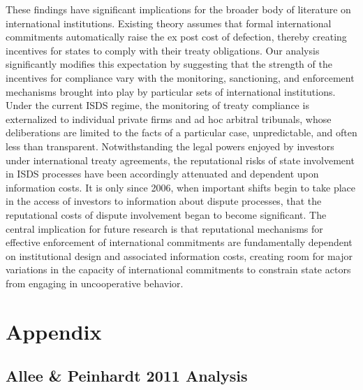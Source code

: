 \documentclass[12pt,onesided]{amsart}
\begin{document}
These findings have significant implications for the broader body of literature on international institutions. Existing theory assumes that formal international commitments automatically raise the ex post cost of defection, thereby creating incentives for states to comply with their treaty obligations. Our analysis significantly modifies this expectation by suggesting that the strength of the incentives for compliance vary with the monitoring, sanctioning, and enforcement mechanisms brought into play by particular sets of international institutions. Under the current ISDS regime, the monitoring of treaty compliance is externalized to individual private firms and ad hoc arbitral tribunals, whose deliberations are limited to the facts of a particular case, unpredictable, and often less than transparent. Notwithstanding the legal powers enjoyed by investors under international treaty agreements, the reputational risks of state involvement in ISDS processes have been accordingly attenuated and dependent upon information costs. It is only since 2006, when important shifts begin to take place in the access of investors to information about dispute processes, that the reputational costs of dispute involvement began to become significant. The central implication for future research is that reputational mechanisms for effective enforcement of international commitments are fundamentally dependent on institutional design and associated information costs, creating room for major variations in the capacity of international commitments to constrain state actors from engaging in uncooperative behavior.


\newpage






\newpage

\section*{Appendix}
\label{appendix}

\appendix
\setcounter{figure}{0} \renewcommand{\thefigure}{A.\arabic{figure}}
\setcounter{table}{0} \renewcommand{\thetable}{A.\arabic{table}}

\subsection*{Allee \& Peinhardt 2011 Analysis}
\end{document}
